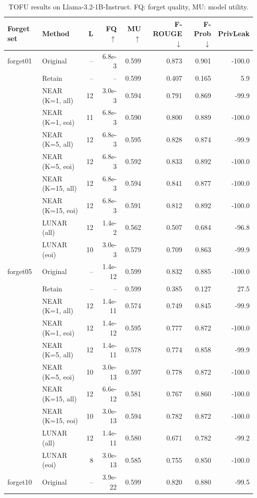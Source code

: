 \begin{table}[t]
\centering\small
\caption{TOFU results on Llama-3.2-1B-Instruct. FQ: forget quality, MU: model utility.}
\begin{tabular}{llrrrrrr}
\toprule
Forget set & Method & L & FQ$\uparrow$ & MU$\uparrow$ & F-ROUGE$\downarrow$ & F-Prob$\downarrow$ & PrivLeak \\
\midrule
forget01 & Original & -- & 6.8e-3 & 0.599 & 0.873 & 0.901 & -100.0 \\
 & Retain & -- & -- & 0.599 & 0.407 & 0.165 & 5.9 \\
 & NEAR (K=1, all) & 12 & 3.0e-3 & 0.594 & 0.791 & 0.869 & -99.9 \\
 & NEAR (K=1, eoi) & 11 & 6.8e-3 & 0.590 & 0.800 & 0.889 & -100.0 \\
 & NEAR (K=5, all) & 12 & 6.8e-3 & 0.595 & 0.828 & 0.874 & -99.9 \\
 & NEAR (K=5, eoi) & 12 & 6.8e-3 & 0.592 & 0.833 & 0.892 & -100.0 \\
 & NEAR (K=15, all) & 12 & 6.8e-3 & 0.594 & 0.841 & 0.877 & -100.0 \\
 & NEAR (K=15, eoi) & 12 & 6.8e-3 & 0.591 & 0.812 & 0.892 & -100.0 \\
 & LUNAR (all) & 12 & 1.4e-2 & 0.562 & 0.507 & 0.684 & -96.8 \\
 & LUNAR (eoi) & 10 & 3.0e-3 & 0.579 & 0.709 & 0.863 & -99.9 \\
\midrule
forget05 & Original & -- & 1.4e-12 & 0.599 & 0.832 & 0.885 & -100.0 \\
 & Retain & -- & -- & 0.599 & 0.385 & 0.127 & 27.5 \\
 & NEAR (K=1, all) & 12 & 1.4e-11 & 0.574 & 0.749 & 0.845 & -99.9 \\
 & NEAR (K=1, eoi) & 12 & 1.4e-12 & 0.595 & 0.777 & 0.872 & -100.0 \\
 & NEAR (K=5, all) & 12 & 1.4e-11 & 0.578 & 0.774 & 0.858 & -99.9 \\
 & NEAR (K=5, eoi) & 10 & 3.0e-13 & 0.597 & 0.778 & 0.872 & -100.0 \\
 & NEAR (K=15, all) & 12 & 6.6e-12 & 0.581 & 0.767 & 0.860 & -100.0 \\
 & NEAR (K=15, eoi) & 10 & 3.0e-13 & 0.594 & 0.782 & 0.872 & -100.0 \\
 & LUNAR (all) & 12 & 1.4e-11 & 0.580 & 0.671 & 0.782 & -99.2 \\
 & LUNAR (eoi) & 8 & 3.0e-13 & 0.585 & 0.755 & 0.850 & -100.0 \\
\midrule
forget10 & Original & -- & 3.9e-22 & 0.599 & 0.820 & 0.880 & -99.5 \\

\end{tabular}
\end{table}
